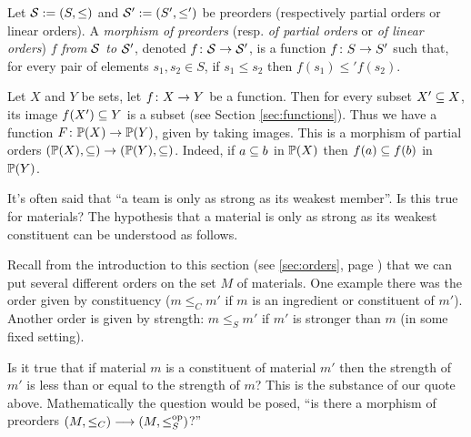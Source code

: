 \begin{blockRUS}
\end{blockRUS}

\begin{definitionENG}\label{def:morphism of orders}
Let $\mcS:=(S,\leq)$ and $\mcS':=(S',\leq')$ be preorders (respectively partial orders or linear orders). A {\em morphism of preorders} (resp. {\em of partial orders} or {\em of linear orders}) $f$ {\em from $\mcS$ to $\mcS'$}, denoted $f\taking\mcS\to\mcS'$, is a function $f\taking S\to S'$ such that, for every pair of elements $s_1,s_2\in S$, if $s_1\leq s_2$ then $f(s_1)\leq' f(s_2)$.
\end{definitionENG}

\begin{definitionRUS}\label{def:morphism of orders}
\end{definitionRUS}

\begin{exampleENG}
Let $X$ and $Y$ be sets, let $f\taking X\to Y$ be a function. Then for every subset $X'\ss X$, its image $f(X')\ss Y$ is a subset (see Section \ref{sec:functions}). Thus we have a function $F\taking\PP(X)\to\PP(Y)$, given by taking images. This is a morphism of partial orders $(\PP(X),\ss)\to(\PP(Y),\ss)$. Indeed, if $a\ss b$ in $\PP(X)$ then $f(a)\ss f(b)$ in $\PP(Y)$.
\end{exampleENG}

\begin{exampleRUS}
\end{exampleRUS}

\begin{applicationENG}
It's often said that “a team is only as strong as its weakest member”. Is this true for materials? The hypothesis that a material is only as strong as its weakest constituent can be understood as follows. 

Recall from the introduction to this section (see \ref{sec:orders}, page \pageref{sec:orders}) that we can put several different orders on the set $M$ of materials. One example there was the order given by constituency ($m\leq_C m'$ if $m$ is an ingredient or constituent of $m'$). Another order is given by strength: $m\leq_S m'$ if $m'$ is stronger than $m$ (in some fixed setting). 

Is it true that if material $m$ is a constituent of material $m'$ then the strength of $m'$ is less than or equal to the strength of $m$? This is the substance of our quote above. Mathematically the question would be posed, “is there a morphism of preorders $(M,\leq_C)\too(M,\leq_S\op)$?”
\end{applicationENG}

